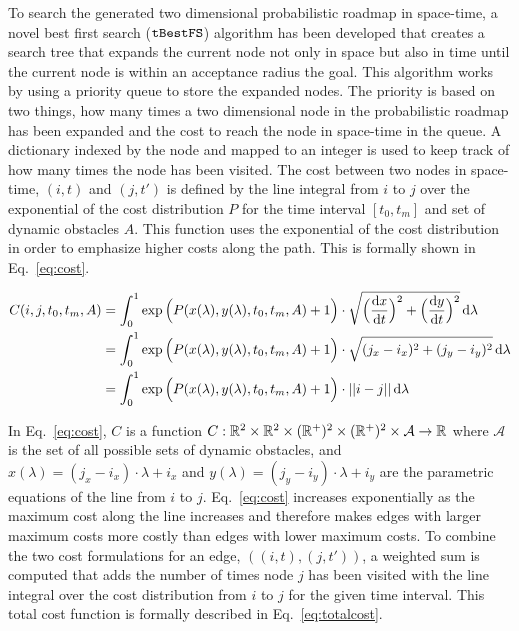 To search the generated two dimensional probabilistic roadmap in space-time, a
novel best first search ($\Acronym{tBestFS}$) algorithm has been developed that
creates a search tree that expands the current node not only in space but also
in time until the current node is within an acceptance radius the goal. This
algorithm works by using a priority queue to store the expanded nodes. The
priority is based on two things, how many times a two dimensional node in the
probabilistic roadmap has been expanded and the cost to reach the node in
space-time in the queue. A dictionary indexed by the node and mapped to an
integer is used to keep track of how many times the node has been visited. The
cost between two nodes in space-time, $(i, t)$ and $(j, t')$ is defined by the
line integral from $i$ to $j$ over the exponential of the cost distribution $P$
for the time interval $[t_0, t_m]$ and set of dynamic obstacles $A$. This
function uses the exponential of the cost distribution in order to emphasize
higher costs along the path. This is formally shown in Eq.~\ref{eq:cost}.


\begin{align}
    C(i, j, t_0, t_m, A) &= \int^1_0 \exp{\Big(
        P(x(\lambda), y(\lambda), t_0, t_m, A) + 1 \Big)
    } \cdot \sqrt{\Big(\frac{{\mathrm{d}} x}{{\mathrm{d}} t}\Big)^2
    + \Big(\frac{{\mathrm{d}} y}{{\mathrm{d}} t}\Big)^2}
    \,\mathrm{d}\lambda \notag \\
    &= \int^1_0 \exp{\Big(
        P(x(\lambda), y(\lambda), t_0, t_m, A) + 1 \Big)
    } \cdot \sqrt{(j_x - i_x)^2 + (j_y - i_y)^2}
    \,\mathrm{d}\lambda \notag \\
    &= \int^1_0 \exp{\Big(
        P(x(\lambda), y(\lambda), t_0, t_m, A) + 1 \Big)
    } \cdot ||i - j|| \,\mathrm{d}\lambda
    \label{eq:cost}
\end{align}

In Eq.~\ref{eq:cost}, $C$ is a function $C: \mathbb{R}^2 \times \mathbb{R}^2 \times (\mathbb{R}^+)^2
\times (\mathbb{R}^+)^2 \times \mathcal{A} \rightarrow \mathbb{R}$ where $\mathcal{A}$ is the
set of all possible sets of dynamic obstacles, and $x(\lambda) = (j_x - i_x)
\cdot \lambda + i_x$ and $y(\lambda) = (j_y - i_y) \cdot \lambda + i_y$ are the
parametric equations of the line from $i$ to $j$.  Eq.~\ref{eq:cost} increases
exponentially as the maximum cost along the line increases and therefore makes
edges with larger maximum costs more costly than edges with lower maximum
costs. To combine the two cost formulations for an edge, $((i, t), (j, t'))$, a
weighted sum is computed that adds the number of times node $j$ has been
visited with the line integral over the cost distribution from $i$ to $j$ for
the given time interval. This total cost function is formally described in
Eq.~\ref{eq:totalcost}.

